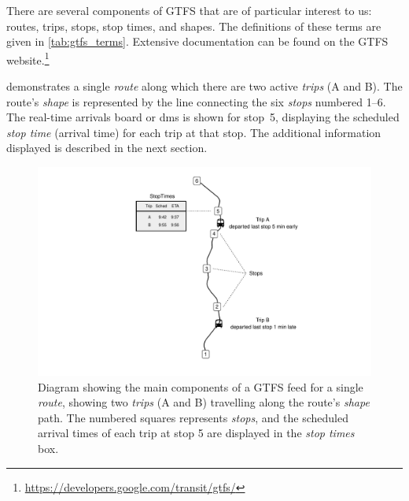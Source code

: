 There are several components of GTFS that are of particular interest to us: routes, trips, stops, stop times, and shapes. The definitions of these terms are given in \cref{tab:gtfs_terms}. Extensive documentation can be found on the GTFS website.\footnote{\url{https://developers.google.com/transit/gtfs/}}


 demonstrates a single \emph{route} along which there are two active \emph{trips} (A and B). The route's \emph{shape} is represented by the line connecting the six \emph{stops} numbered 1--6. The real-time arrivals board or \gls{dms} is shown for stop~5, displaying the scheduled \emph{stop time} (arrival time) for each trip at that stop. The additional information displayed is described in the next section.



\begin{knitrout}\small
{}\color{fgcolor}\begin{figure}

{\centering \includegraphics[width=\textwidth]{figure/gtfs_nw-1} 

}

\caption[Diagram of the main components of a GTFS feed]{Diagram showing the main components of a GTFS feed for a single \emph{route}, showing two \emph{trips} (A and B) travelling along the route's \emph{shape} path. The numbered squares represents \emph{stops}, and the scheduled arrival times of each trip at stop 5 are displayed in the \emph{stop times} box.}\label{fig:gtfs_nw}
\end{figure}


\end{knitrout}



